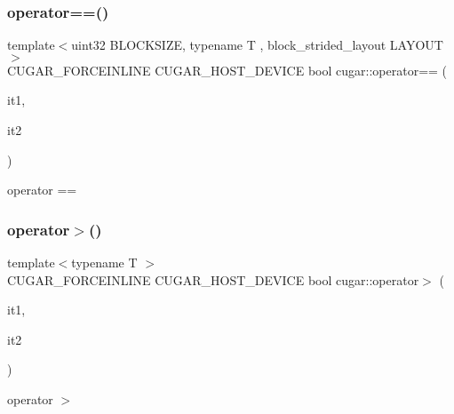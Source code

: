 \subsubsection{\texorpdfstring{operator==()}{operator==()}\hspace{0.1cm}{\footnotesize\ttfamily [2/2]}}
{\footnotesize\ttfamily template$<$uint32 B\+L\+O\+C\+K\+S\+I\+ZE, typename T , block\+\_\+strided\+\_\+layout L\+A\+Y\+O\+UT$>$ \\
C\+U\+G\+A\+R\+\_\+\+F\+O\+R\+C\+E\+I\+N\+L\+I\+NE C\+U\+G\+A\+R\+\_\+\+H\+O\+S\+T\+\_\+\+D\+E\+V\+I\+CE bool cugar\+::operator== (\begin{DoxyParamCaption}\item[{const \hyperlink{structcugar_1_1block__strided__iterator}{block\+\_\+strided\+\_\+iterator}$<$ B\+L\+O\+C\+K\+S\+I\+ZE, T, L\+A\+Y\+O\+UT $>$}]{it1,  }\item[{const \hyperlink{structcugar_1_1block__strided__iterator}{block\+\_\+strided\+\_\+iterator}$<$ B\+L\+O\+C\+K\+S\+I\+ZE, T, L\+A\+Y\+O\+UT $>$}]{it2 }\end{DoxyParamCaption})}

operator == \mbox{\label{group___iterators_ga1e9e6257c01330e7b3620c9f3a81ee8f}} 
\subsubsection{\texorpdfstring{operator$>$()}{operator>()}}
{\footnotesize\ttfamily template$<$typename T $>$ \\
C\+U\+G\+A\+R\+\_\+\+F\+O\+R\+C\+E\+I\+N\+L\+I\+NE C\+U\+G\+A\+R\+\_\+\+H\+O\+S\+T\+\_\+\+D\+E\+V\+I\+CE bool cugar\+::operator$>$ (\begin{DoxyParamCaption}\item[{const \hyperlink{structcugar_1_1strided__iterator}{strided\+\_\+iterator}$<$ T $>$}]{it1,  }\item[{const \hyperlink{structcugar_1_1strided__iterator}{strided\+\_\+iterator}$<$ T $>$}]{it2 }\end{DoxyParamCaption})}

operator $>$ \mbox{\label{group___iterators_ga9e4c4ee0e4663d9e1c671a22056c9533}} 
